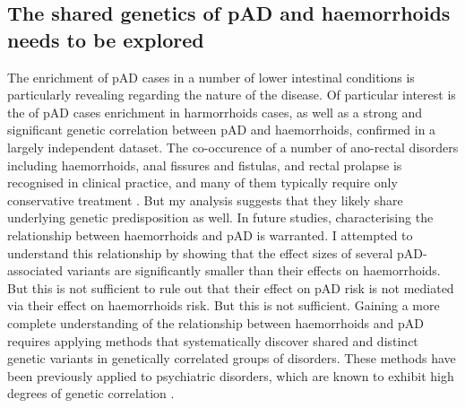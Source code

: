 \subsection{The shared genetics of pAD and haemorrhoids needs to be explored}

The enrichment of pAD cases in a number of lower intestinal conditions is particularly revealing regarding the nature of the disease. Of particular interest is the of pAD cases enrichment in harmorrhoids cases, as well as a strong and significant genetic correlation between pAD and haemorrhoids, confirmed in a largely independent dataset. The co-occurence of a number of ano-rectal disorders including haemorrhoids, anal fissures and fistulas, and rectal prolapse is recognised in clinical practice, and many of them typically require only conservative treatment \cite{Felt-Bersma2009-am,Foxx-Orenstein2014-el}. But my analysis suggests that they likely share underlying genetic predisposition as well. In future studies, characterising the relationship between haemorrhoids and pAD is warranted. I attempted to understand this relationship by showing that the effect sizes of several pAD-associated variants are significantly smaller than their effects on haemorrhoids. But this is not sufficient to rule out that their effect on pAD risk is not mediated via their effect on haemorrhoids risk. But this is not sufficient. Gaining a more complete understanding of the relationship between haemorrhoids and pAD requires applying methods that systematically discover shared and distinct genetic variants in genetically correlated groups of disorders. These methods have been previously applied to psychiatric disorders, which are known to exhibit high degrees of genetic correlation \cite{Grotzinger2022-ak}.  






